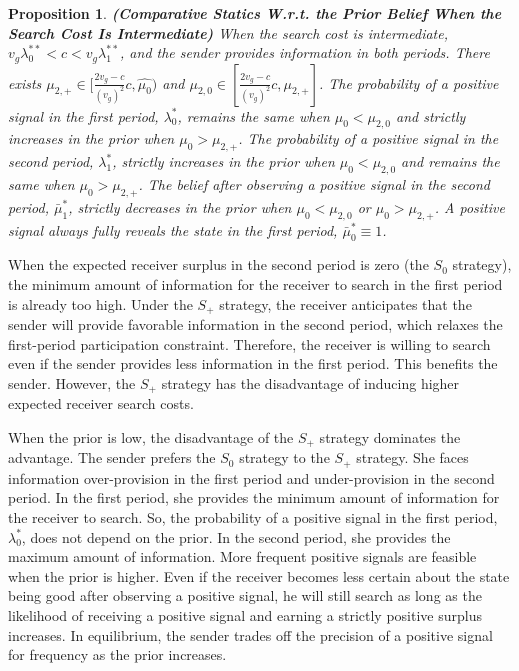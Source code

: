 \documentclass[11pt]{extarticle}
\newtheorem{proposition}{Proposition}
\begin{document}
\begin{proposition}\label{strategyI}\textbf{(Comparative Statics W.r.t. the Prior Belief When the Search Cost Is Intermediate)}
	When the search cost is intermediate, $v_g\lambda_0^{**} < c < v_g\lambda_1^{**}$, and the sender provides information in both periods. There exists $\mu_{2,+}\in [\frac{2v_g-c}{(v_g)^2}c,\widehat{\mu_0})$ and $\mu_{2,0} \in [\frac{2v_g-c}{(v_g)^2}c,\mu_{2,+}]$. The probability of a positive signal in the first period, $\lambda_{0}^*$, remains the same when $\mu_0 < \mu_{2,0}$ and strictly increases in the prior when $\mu_0 > \mu_{2,+}$. The probability of a positive signal in the second period, $\lambda_{1}^*$, strictly increases in the prior when $\mu_0 < \mu_{2,0}$ and remains the same when $\mu_0 > \mu_{2,+}$. The belief after observing a positive signal in the second period, $\bar{\mu}_1^*$, strictly decreases in the prior when $\mu_0 < \mu_{2,0}$ or $\mu_0 > \mu_{2,+}$. A positive signal always fully reveals the state in the first period, $\bar{\mu}_0^* \equiv 1$.
\end{proposition}

When the expected receiver surplus in the second period is zero (the $S_0$ strategy), the minimum amount of information for the receiver to search in the first period is already too high. Under the $S_+$ strategy, the receiver anticipates that the sender will provide favorable information in the second period, which relaxes the first-period participation constraint. Therefore, the receiver is willing to search even if the sender provides less information in the first period. This benefits the sender. However, the $S_+$ strategy has the disadvantage of inducing higher expected receiver search costs.

When the prior is low, the disadvantage of the $S_+$ strategy dominates the advantage. The sender prefers the $S_0$ strategy to the $S_+$ strategy. She faces information over-provision in the first period and under-provision in the second period. In the first period, she provides the minimum amount of information for the receiver to search. So, the probability of a positive signal in the first period, $\lambda_0^*$, does not depend on the prior. In the second period, she provides the maximum amount of information. More frequent positive signals are feasible when the prior is higher. Even if the receiver becomes less certain about the state being good after observing a positive signal, he will still search as long as the likelihood of receiving a positive signal and earning a strictly positive surplus increases. In equilibrium, the sender trades off the precision of a positive signal for frequency as the prior increases. 
\end{document}

